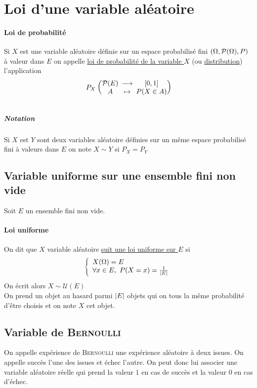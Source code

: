 	\section{Loi d'une variable aléatoire}
		\traitd
		\paragraph{Loi de probabilité}
			Si $X$ est une variable aléatoire définie sur un espace probabilisé fini $(\Omega,{\mathcal{P}}(\Omega),P)$ à valeur dans $E$ on appelle \uline{loi de probabilité de la variable $X$} (ou \uline{distribution}) l'application 
			\[ P_X ~ \appli{\Part(E) }{A}{[0,1]}{P(X\in A)} \] \trait
		\subparagraph{Notation}Si $X$ est $Y$ sont deux variables aléatoire définies sur un même espace probabilisé fini à valeurs dans $E$ on note $X\sim Y$ si $P_X=P_Y$
		\vspace*{0.5cm} \\ 
	\subsection{Variable uniforme sur une ensemble fini non vide}
		Soit $E$ un ensemble fini non vide.
		\traitd
		\paragraph{Loi uniforme}
			On dit que $X$ variable aléatoire \uline{suit une loi uniforme sur $E$} si 
			\[ \left\{ \begin{array}{l} X(\Omega) = E \\ \forall x\in E,~P(X=x)= \frac{1}{\left\vert E \right\vert} \end{array} \right.\]
			On écrit alors $X\sim \mathcal{U}(E)$ \trait
		\vspace*{-1.1cm} \\ On prend un objet au hasard parmi $\left\vert E \right\vert$ objets qui on tous la même probabilité d'être choisis et on note $X$ cet objet.
	\subsection{Variable de \textsc{Bernoulli}}
		On appelle expérience de \textsc{Bernoulli} une expérience aléatoire à deux issues. On appelle succès l'une des issues et échec l'autre. On peut donc lui associer une variable aléatoire réelle qui prend la valeur $1$ en cas de succès et la valeur $0$ en cas d'échec. \\ \traitd
